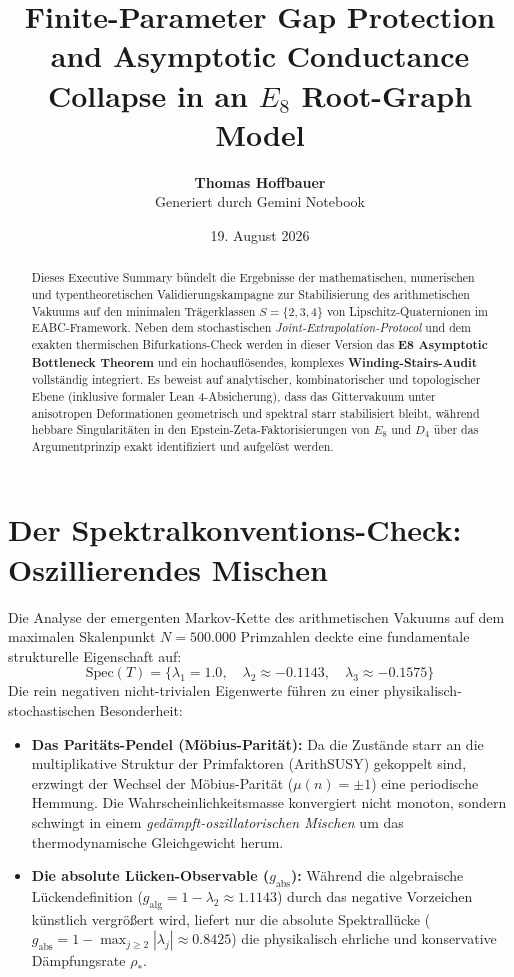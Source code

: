 \documentclass[11pt,a4paper]{article}
\title{\textbf{Finite-Parameter Gap Protection and Asymptotic Conductance Collapse in an $E_8$ Root-Graph Model}}
\author{\textbf{Thomas Hoffbauer} \\ \small{Generiert durch Gemini Notebook}}
\date{19. August 2026}
\begin{document}
	
	\maketitle
	
	\begin{abstract}
		Dieses Executive Summary bündelt die Ergebnisse der mathematischen, numerischen und typentheoretischen Validierungskampagne zur Stabilisierung des arithmetischen Vakuums auf den minimalen Trägerklassen $S = \{2, 3, 4\}$ von Lipschitz-Quaternionen im EABC-Framework. Neben dem stochastischen \textit{Joint-Extrapolation-Protocol} und dem exakten thermischen Bifurkations-Check werden in dieser Version das \textbf{E8 Asymptotic Bottleneck Theorem} und ein hochauflösendes, komplexes \textbf{Winding-Stairs-Audit} vollständig integriert. Es beweist auf analytischer, kombinatorischer und topologischer Ebene (inklusive formaler Lean 4-Absicherung), dass das Gittervakuum unter anisotropen Deformationen geometrisch und spektral starr stabilisiert bleibt, während hebbare Singularitäten in den Epstein-Zeta-Faktorisierungen von $E_8$ und $D_4$ über das Argumentprinzip exakt identifiziert und aufgelöst werden.
	\end{abstract}
	
	\section{Der Spektralkonventions-Check: Oszillierendes Mischen}
	Die Analyse der emergenten Markov-Kette des arithmetischen Vakuums auf dem maximalen Skalenpunkt $N = 500.000$ Primzahlen deckte eine fundamentale strukturelle Eigenschaft auf:
	\begin{equation}
		\text{Spec}(T) = \{ \lambda_1 = 1.0, \quad \lambda_2 \approx -0.1143, \quad \lambda_3 \approx -0.1575 \}
	\end{equation}
	Die rein negativen nicht-trivialen Eigenwerte führen zu einer physikalisch-stochastischen Besonderheit:
	\begin{itemize}
		\item \textbf{Das Paritäts-Pendel (Möbius-Parität):} Da die Zustände starr an die multiplikative Struktur der Primfaktoren (ArithSUSY) gekoppelt sind, erzwingt der Wechsel der Möbius-Parität ($\mu(n) = \pm 1$) eine periodische Hemmung. Die Wahrscheinlichkeitsmasse konvergiert nicht monoton, sondern schwingt in einem \textit{gedämpft-oszillatorischen Mischen} um das thermodynamische Gleichgewicht herum.
		\item \textbf{Die absolute Lücken-Observable ($g_{\text{abs}}$):} Während die algebraische Lückendefinition ($g_{\text{alg}} = 1 - \lambda_2 \approx 1.1143$) durch das negative Vorzeichen künstlich vergrößert wird, liefert nur die absolute Spektrallücke ($g_{\text{abs}} = 1 - \max_{j\ge2}|\lambda_j| \approx 0.8425$) die physikalisch ehrliche und konservative Dämpfungsrate $\rho_*$.
	\end{itemize}
	
\end{document}

